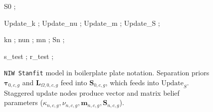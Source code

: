 \documentclass[11pt]{report}
\begin{document}
\begin{figure}[htbp]
{{    %
     {S0} ; %

     {Update_k} ; %
     {Update_nu} ; %
     {Update_m} ; %
     {Update_S} ; %

     {kn} ; %
     {nun} ; %
     {mn} ; %
     {Sn} ; %

     {s_test} ; %
     {r_test} ; %
  }}
  \caption{\texttt{NIW Stanfit} model in boilerplate plate notation. Separation priors $\boldsymbol{\tau}_{0,c,g}$ and $\mathbf{L}_{\Omega,0,c,g}$ feed into $\mathbf{S}_{0,c,g}$, which feeds into $\text{Update}_S$. Staggered update nodes produce vector and matrix belief parameters ($\kappa_{n,c,g}, \nu_{n,c,g}, \mathbf{m}_{n,c,g}, \mathbf{S}_{n,c,g}$).}
\end{figure}
\end{document}
